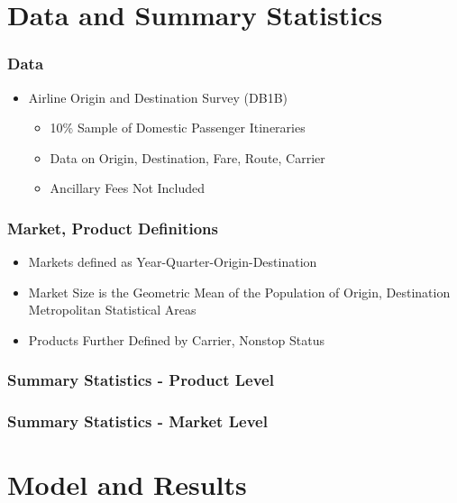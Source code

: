 \documentclass[xcolor=dvipsnames]{beamer}
\begin{document}
    \section{Data and Summary Statistics}

    \begin{frame}
		\frametitle{Data}
		\begin{itemize}
			\item Airline Origin and Destination Survey (DB1B)
			\begin{itemize}
				\item 10\% Sample of Domestic Passenger Itineraries 
				\item Data on Origin, Destination, Fare, Route, Carrier
                \item Ancillary Fees Not Included 
			\end{itemize}
		\end{itemize}
	\end{frame}


    \begin{frame}
        \frametitle{Market, Product Definitions}
        \begin{itemize}
        	\item Markets defined as Year-Quarter-Origin-Destination 
			\item Market Size is the Geometric Mean of the Population of Origin, Destination Metropolitan Statistical Areas
			\item Products Further Defined by Carrier, Nonstop Status
        \end{itemize}
    \end{frame}

      \begin{frame}
        \frametitle{Summary Statistics - Product Level}
            \resizebox{0.8\linewidth}{!}{%

}
    \end{frame}

    \begin{frame}
        \frametitle{Summary Statistics - Market Level}
        \centering
    \resizebox{\linewidth}{!}{%

}

    \end{frame}

    \section{Model and Results}
\end{document}
